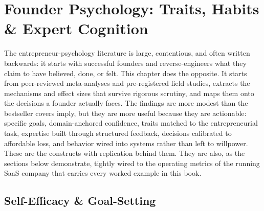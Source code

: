 \chapter{Founder Psychology: Traits, Habits \& Expert Cognition}\label{ch:founder-psychology}


The entrepreneur-psychology literature is large, contentious, and often written backwards: it
starts with successful founders and reverse-engineers what they claim to have believed, done, or
felt. This chapter does the opposite. It starts from peer-reviewed meta-analyses and
pre-registered field studies, extracts the mechanisms and effect sizes that survive rigorous
scrutiny, and maps them onto the decisions a founder actually faces. The findings are more
modest than the bestseller covers imply, but they are more useful because they are
actionable: specific goals, domain-anchored confidence, traits matched to the entrepreneurial
task, expertise built through structured feedback, decisions calibrated to affordable loss, and
behavior wired into systems rather than left to willpower. These are the constructs with
replication behind them. They are also, as the sections below demonstrate, tightly wired to the
operating metrics of the running SaaS company that carries every worked example in this book.

\section{Self-Efficacy \& Goal-Setting}\label{sec:self-efficacy-goals}

